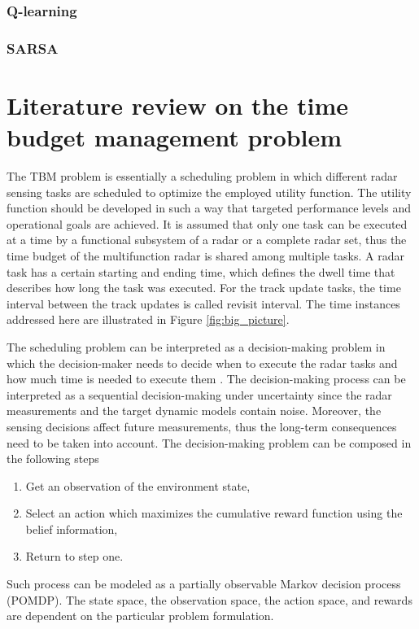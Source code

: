 \documentclass[11pt,a4paper]{article}
\begin{document}
\subsubsection{Q-learning}

\subsubsection{SARSA}

\newpage
\section{Literature review on the time budget management problem}

The TBM problem is essentially a scheduling problem in which different radar sensing tasks are scheduled to optimize the employed utility function.
The utility function should be developed in such a way that targeted performance levels and operational goals are achieved.
It is assumed that only one task can be executed at a time by a functional subsystem of a radar or a complete radar set, thus the time budget of the multifunction radar is shared among multiple tasks.
A radar task has a certain starting and ending time, which defines the dwell time that describes how long the task was executed.
For the track update tasks, the time interval between the track updates is called revisit interval.
The time instances addressed here are illustrated in Figure \ref{fig:big_picture}.

The scheduling problem can be interpreted as a decision-making problem in which the decision-maker needs to decide when to execute the radar tasks and how much time is needed to execute them \cite{Wintenby2006}.  
The decision-making process can be interpreted as a sequential decision-making under uncertainty since the radar measurements and the target dynamic models contain noise.
Moreover, the sensing decisions affect future measurements, thus the long-term consequences need to be taken into account.
The decision-making problem can be composed in the following steps 
\begin{enumerate}
    \item Get an observation of the environment state,
    \item Select an action which maximizes the cumulative reward function using the belief information,
    \item Return to step one.
\end{enumerate}
Such process can be modeled as a partially observable Markov decision process (POMDP).
The state space, the observation space, the action space, and rewards are dependent on the particular problem formulation.
\end{document}
